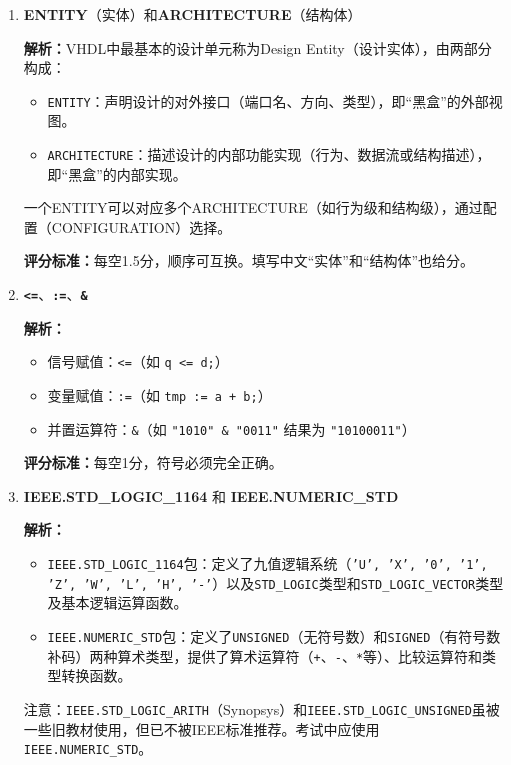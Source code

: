 \begin{enumerate}[label=\arabic*., leftmargin=*]

\item \textbf{ENTITY}（实体）和\textbf{ARCHITECTURE}（结构体）

\noindent\textbf{解析：}VHDL中最基本的设计单元称为Design Entity（设计实体），由两部分构成：
\begin{itemize}
  \item \texttt{ENTITY}：声明设计的对外接口（端口名、方向、类型），即“黑盒”的外部视图。
  \item \texttt{ARCHITECTURE}：描述设计的内部功能实现（行为、数据流或结构描述），即“黑盒”的内部实现。
\end{itemize}
一个ENTITY可以对应多个ARCHITECTURE（如行为级和结构级），通过配置（CONFIGURATION）选择。

\noindent\textbf{评分标准：}每空1.5分，顺序可互换。填写中文“实体”和“结构体”也给分。


\item \textbf{\texttt{<=}}、\textbf{\texttt{:=}}、\textbf{\texttt{\&}}

\noindent\textbf{解析：}
\begin{itemize}
  \item 信号赋值：\texttt{<=}（如 \texttt{q <= d;}）
  \item 变量赋值：\texttt{:=}（如 \texttt{tmp := a + b;}）
  \item 并置运算符：\texttt{\&}（如 \texttt{"1010" \& "0011"} 结果为 \texttt{"10100011"}）
\end{itemize}

\noindent\textbf{评分标准：}每空1分，符号必须完全正确。


\item \textbf{IEEE.STD\_LOGIC\_1164} 和 \textbf{IEEE.NUMERIC\_STD}

\noindent\textbf{解析：}
\begin{itemize}
  \item \texttt{IEEE.STD\_LOGIC\_1164}包：定义了九值逻辑系统（\texttt{'U', 'X', '0', '1', 'Z', 'W', 'L', 'H', '-'}）以及\texttt{STD\_LOGIC}类型和\texttt{STD\_LOGIC\_VECTOR}类型及基本逻辑运算函数。
  \item \texttt{IEEE.NUMERIC\_STD}包：定义了\texttt{UNSIGNED}（无符号数）和\texttt{SIGNED}（有符号数补码）两种算术类型，提供了算术运算符（\texttt{+}、\texttt{-}、\texttt{*}等）、比较运算符和类型转换函数。
\end{itemize}
注意：\texttt{IEEE.STD\_LOGIC\_ARITH}（Synopsys）和\texttt{IEEE.STD\_LOGIC\_UNSIGNED}虽被一些旧教材使用，但已不被IEEE标准推荐。考试中应使用\texttt{IEEE.NUMERIC\_STD}。


\end{enumerate}

